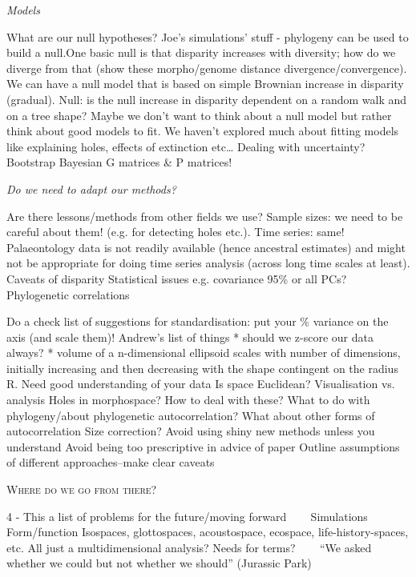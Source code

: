 \documentclass[12pt,letterpaper]{article}
\renewcommand{\section}[1]{%
\bigskip
\begin{center}
\begin{Large}
\normalfont\scshape #1
\medskip
\end{Large}
\end{center}}
\renewcommand{\subsection}[1]{%
\bigskip
\begin{center}
\begin{large}
\normalfont\itshape #1
\end{large}
\end{center}}
\begin{document}
\subsection{Models}
What are our null hypotheses?
Joe’s simulations’ stuff - phylogeny can be used to build a null.One basic null is that disparity increases with diversity; how do we diverge from that (show these morpho/genome distance divergence/convergence).
We can have a null model that is based on simple Brownian increase in disparity (gradual). 
Null: is the null increase in disparity dependent on a random walk and on a tree shape?
Maybe we don’t want to think about a null model but rather think about good models to fit. 
We haven’t explored much about fitting models like explaining holes, effects of extinction etc…
Dealing with uncertainty? Bootstrap Bayesian G matrices \& P matrices!


\subsection{Do we need to adapt our methods?}
Are there lessons/methods from other fields we use?
Sample sizes: we need to be careful about them! (e.g. for detecting holes etc.).
Time series: same! Palaeontology data is not readily available (hence ancestral estimates) and might not be appropriate for doing time series analysis (across long time scales at least).
Caveats of disparity
Statistical issues e.g. covariance
95\% or all PCs?
Phylogenetic correlations

Do a check list of suggestions for standardisation: put your \% variance on the axis (and scale them)!
Andrew’s list of things
* should we z-score our data always?
* volume of a n-dimensional ellipsoid scales with number of dimensions, initially increasing and then decreasing with the shape contingent on the radius R.
Need good understanding of your data
Is space Euclidean?
Visualisation vs. analysis
Holes in morphospace? How to deal with these?
What to do with phylogeny/about phylogenetic autocorrelation?
What about other forms of autocorrelation
Size correction?
Avoid using shiny new methods unless you understand
Avoid being too prescriptive in advice of paper
Outline assumptions of different approaches--make clear caveats




\section{Where do we go from there?}
4 - This a list of problems for the future/moving forward
    Simulations 
    Form/function
Isospaces, glottospaces, acoustospace, ecospace, life-history-spaces, etc. All just a multidimensional analysis? Needs for terms?
    
``We asked whether we could but not whether we should'' (Jurassic Park)
\end{document}
